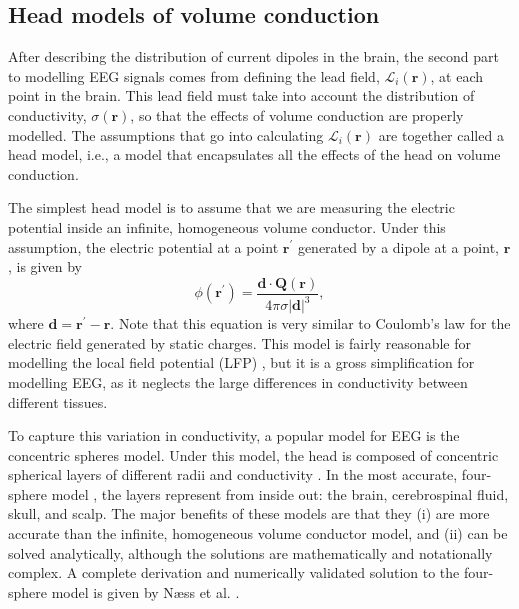 \subsection{Head models of volume conduction} \label{sec:head_models}
After describing the distribution of current dipoles in the brain, the second part to modelling EEG signals comes from defining the lead field, $\mathcal{L}_i(\bm{r})$, at each point in the brain. This lead field must take into account the distribution of conductivity, $\sigma(\bm{r})$, so that the effects of volume conduction are properly modelled. The assumptions that go into calculating $\mathcal{L}_i(\bm{r})$ are together called a head model, i.e., a model that encapsulates all the effects of the head on volume conduction.

The simplest head model is to assume that we are measuring the electric potential inside an infinite, homogeneous volume conductor. Under this assumption, the electric potential at a point $\bm{r}^\prime$ generated by a dipole at a point, $\bm{r}$, is given by
\begin{equation}
    \phi(\bm{r}^\prime) = \frac{\bm{d} \cdot \bm{Q}(\bm{r})}{4\pi\sigma |\bm{d}|^3}\mathrm{,}
\end{equation}
where $\bm{d}=\bm{r}^\prime-\bm{r}$. Note that this equation is very similar to Coulomb's law for the electric field generated by static charges. This model is fairly reasonable for modelling the local field potential (LFP) \cite{Pettersen2012}, but it is a gross simplification for modelling EEG, as it neglects the large differences in conductivity between different tissues.

To capture this variation in conductivity, a popular model for EEG is the concentric spheres model. Under this model, the head is composed of concentric spherical layers of different radii and conductivity \cite{Geisler1961}. In the most accurate, four-sphere model \cite{Hosek1978}, the layers represent from inside out: the brain, cerebrospinal fluid, skull, and scalp. The major benefits of these models are that they (i) are more accurate than the infinite, homogeneous volume conductor model, and (ii) can be solved analytically, although the solutions are mathematically and notationally complex. A complete derivation and numerically validated solution to the four-sphere model is given by Næss et al. \cite{Næss2017}.

